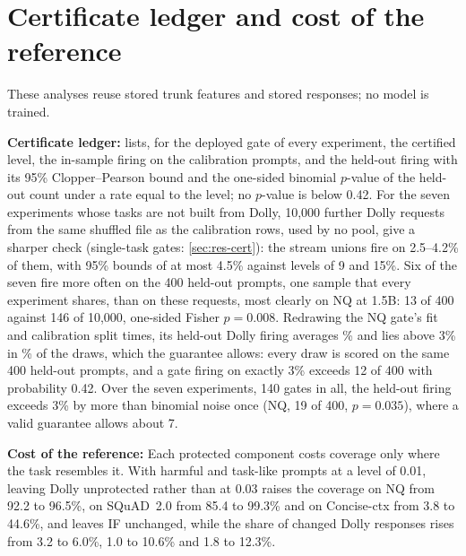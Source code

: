 \documentclass{article}
\theoremstyle{plain}
\theoremstyle{definition}
\theoremstyle{remark}
\begin{document}
\section{Certificate ledger and cost of the reference}
\label{app:v3}

These analyses reuse stored trunk features and stored responses; no model is trained.

\textbf{Certificate ledger:}  lists, for the deployed gate of every experiment, the certified
level, the in-sample firing on the calibration prompts, and the held-out firing with its 95\% Clopper--Pearson bound
and the one-sided binomial $p$-value of the held-out count under a rate equal to the level; no $p$-value is below 0.42.
For the seven experiments whose tasks are not built from Dolly, 10{,}000 further Dolly requests from the same shuffled
file as the calibration rows, used by no pool, give a sharper check (single-task gates: \cref{sec:res-cert}): the stream unions fire on 2.5--4.2\% of them, with
95\% bounds of at most 4.5\% against levels of 9 and 15\%. Six of the seven fire more often on the 400 held-out prompts, one sample that every
experiment shares, than on these requests, most clearly on NQ at 1.5B: 13 of 400 against 146 of 10{,}000, one-sided
Fisher $p=0.008$. Redrawing the NQ gate's fit and calibration split \rvNqRdN{} times, its held-out Dolly firing
averages \rvNqRdDollyMean\% and lies above 3\% in \rvNqRdDollyAbove\% of the draws, which the guarantee allows: every
draw is scored on the same 400 held-out prompts, and a gate firing on exactly 3\% exceeds 12 of 400 with probability
0.42. Over the seven experiments, 140 gates in all, the held-out firing exceeds 3\% by more than binomial noise once
(NQ, 19 of 400, $p=0.035$), where a valid guarantee allows about 7.

\textbf{Cost of the reference:} Each protected component costs coverage only where the task resembles it. With
harmful and task-like prompts at a level of 0.01, leaving Dolly unprotected rather than at 0.03 raises the coverage
on NQ from 92.2 to 96.5\%, on SQuAD~2.0 from 85.4 to 99.3\% and on Concise-ctx from 3.8 to 44.6\%, and leaves IF
unchanged, while the share of changed Dolly responses rises from 3.2 to 6.0\%, 1.0 to 10.6\% and 1.8 to 12.3\%.
\end{document}
